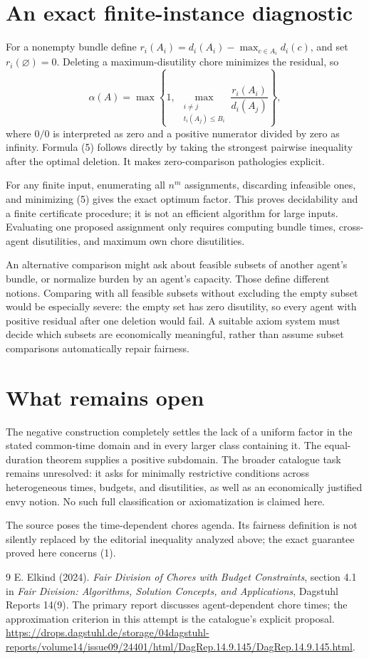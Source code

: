 \documentclass[11pt,a4paper]{article}
\begin{document}
\section{An exact finite-instance diagnostic}
For a nonempty bundle define
$r_i(A_i)=d_i(A_i)-\max_{c\in A_i}d_i(c)$, and set $r_i(\varnothing)=0$. Deleting a maximum-disutility chore minimizes the residual, so
\[
 \alpha(A)=\max\left\{1,\
 \max_{\substack{i\ne j\\t_i(A_j)\le B_i}}
 \frac{r_i(A_i)}{d_i(A_j)}\right\},
 \tag{5}
\]
where $0/0$ is interpreted as zero and a positive numerator divided by zero as infinity. Formula (5) follows directly by taking the strongest pairwise inequality after the optimal deletion. It makes zero-comparison pathologies explicit.

For any finite input, enumerating all $n^m$ assignments, discarding infeasible ones, and minimizing (5) gives the exact optimum factor. This proves decidability and a finite certificate procedure; it is not an efficient algorithm for large inputs. Evaluating one proposed assignment only requires computing bundle times, cross-agent disutilities, and maximum own chore disutilities.

An alternative comparison might ask about feasible subsets of another agent's bundle, or normalize burden by an agent's capacity. Those define different notions. Comparing with all feasible subsets without excluding the empty subset would be especially severe: the empty set has zero disutility, so every agent with positive residual after one deletion would fail. A suitable axiom system must decide which subsets are economically meaningful, rather than assume subset comparisons automatically repair fairness.
\section{What remains open}
The negative construction completely settles the lack of a uniform factor in the stated common-time domain and in every larger class containing it. The equal-duration theorem supplies a positive subdomain. The broader catalogue task remains unresolved: it asks for minimally restrictive conditions across heterogeneous times, budgets, and disutilities, as well as an economically justified envy notion. No such full classification or axiomatization is claimed here.

The source poses the time-dependent chores agenda. Its fairness definition is not silently replaced by the editorial inequality analyzed above; the exact guarantee proved here concerns (1).
\begin{thebibliography}{9}
 E. Elkind (2024). \emph{Fair Division of Chores with Budget Constraints}, section 4.1 in \emph{Fair Division: Algorithms, Solution Concepts, and Applications}, Dagstuhl Reports 14(9).
The primary report discusses agent-dependent chore times; the approximation criterion in this attempt is the catalogue's explicit proposal.
\url{https://drops.dagstuhl.de/storage/04dagstuhl-reports/volume14/issue09/24401/html/DagRep.14.9.145/DagRep.14.9.145.html}.
\end{thebibliography}
\end{document}
